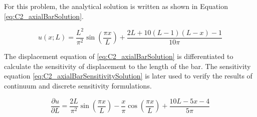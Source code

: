 For this problem, the analytical solution is written as shown in Equation \eqref{eq:C2_axialBarSolution}.

\begin{equation}\label{eq:C2_axialBarSolution}
	u(x; L) = 
	\frac{L^2}{\pi^2} \sin \left( \frac{\pi x}{L} \right) + 
	\frac{2L + 10(L - 1)(L - x) - 1}{10 \pi}
\end{equation}

The displacement equation of \eqref{eq:C2_axialBarSolution} is differentiated to calculate the sensitivity of displacement to the length of the bar. The sensitivity equation \eqref{eq:C2_axialBarSensitivitySolution} is later used to verify the results of continuum and discrete sensitivity formulations.

\begin{equation}\label{eq:C2_axialBarSensitivitySolution}
	\dfrac{\partial u}{\partial L} = 
	\dfrac{2L}{\pi^2} \sin \left( \frac{\pi x}{L} \right) - 
	\dfrac{x}{\pi} \cos \left( \frac{\pi x}{L} \right) + 
	\dfrac{10L - 5x - 4}{5 \pi}
\end{equation}


